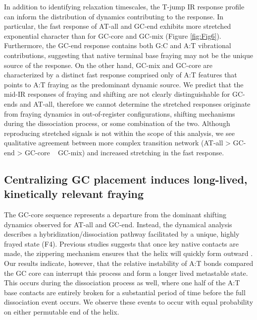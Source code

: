 \documentclass[journal=jpcbfk,manuscript=article]{achemso}
\begin{document}
In addition to identifying relaxation timescales, the T-jump IR response profile can inform the distribution of dynamics contributing to the response. In particular, the fast response of AT-all and GC-end exhibits more stretched exponential character than for GC-core and GC-mix  (Figure \ref{fig:Fig6}). Furthermore, the GC-end response contains both G:C and A:T vibrational contributions, suggesting that native terminal base fraying may not be the unique source of the response. On the other hand, GC-mix and GC-core are characterized by a distinct fast response comprised only of A:T features that points to A:T fraying as the predominant dynamic source. We predict that the mid-IR responses of fraying and shifting are not clearly distinguishable for GC-ends and AT-all, therefore we cannot determine the stretched responses originate from fraying dynamics in out-of-register configurations, shifting mechanisms during the dissociation process, or some combination of the two. Although reproducing stretched signals is not within the scope of this analysis, we see qualitative agreement between more complex transition network (AT-all > GC-end > GC-core ~ GC-mix) and increased stretching in the fast response. 




\subsection{Centralizing GC placement induces long-lived, kinetically relevant fraying} %

The GC-core sequence represents a departure from the dominant shifting dynamics observed for AT-all and GC-end. Instead, the dynamical analysis describes a hybridization/dissociation pathway facilitated by a unique, highly frayed state (F4). Previous studies suggests that once key native contacts are made, the zippering mechanism ensures that the helix will quickly form outward \citep{Romano2013DNADependence, Yin2011KineticsHybridization}. Our results indicate, however, that the relative instability of A:T bonds compared the GC core can interrupt this process and form a longer lived metastable state. This occurs during the dissociation process as well, where one half of the A:T base contacts are entirely broken for a substantial period of time before the full dissociation event occurs. We observe these events to occur with equal probability on either permutable end of the helix. 
\end{document}
